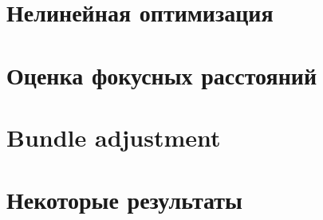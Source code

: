 \chapter{Нелинейная оптимизация}


\chapter{Оценка фокусных расстояний}


\chapter{Bundle adjustment}


\chapter{Некоторые результаты}







